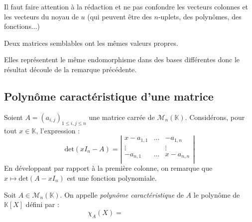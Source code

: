 \documentclass[french,11pt,twoside]{VcCours}
\begin{document}
\begin{Remarque}[\alerte]{} Il faut faire attention à la rédaction et ne pas confondre les vecteurs colonnes et les vecteurs du noyau de $u$ (qui peuvent être des $n$-uplets, des polynômes, des fonctions...)
\end{Remarque}



\begin{Proposition}{} Deux matrices semblables ont les mêmes valeurs propres.
\end{Proposition}

\begin{Demonstration}{} Elles représentent le même endomorphisme dans des bases différentes donc le résultat découle de la remarque précédente.
\end{Demonstration}


\subsection{Polynôme caractéristique d'une matrice}

Soient $A = (a_{i,j})_{1 \leq i,j \leq n}$ une matrice carrée de $\mathcal{M}_n(\mathbb{K})$. Considérons, pour tout $x \in \mathbb{K}$, l'expression :
$$ \textrm{det}(x I_n-A) = \left\vert \begin{array}{ccc}
x-a_{1,1} & \ldots & -a_{1,n} \\
\vdots & & \vdots \\
-a_{n,1} & \ldots & x-a_{n,n} \\
\end{array}\right\vert$$
En développant par rapport à la première colonne, on remarque que $x \mapsto \textrm{det}(A-x I_n)$ est une fonction polynomiale.

\begin{Definition}{} Soit $A \in \mathcal{M}_n(\mathbb{K})$. On appelle \emph{polynôme caractéristique} de $A$ le polynôme de $\mathbb{K}[X]$ défini par :
$$ \chi_A(X) = \phantom{\textrm{det}(X I_n-A)}$$
\end{Definition}
\end{document}
